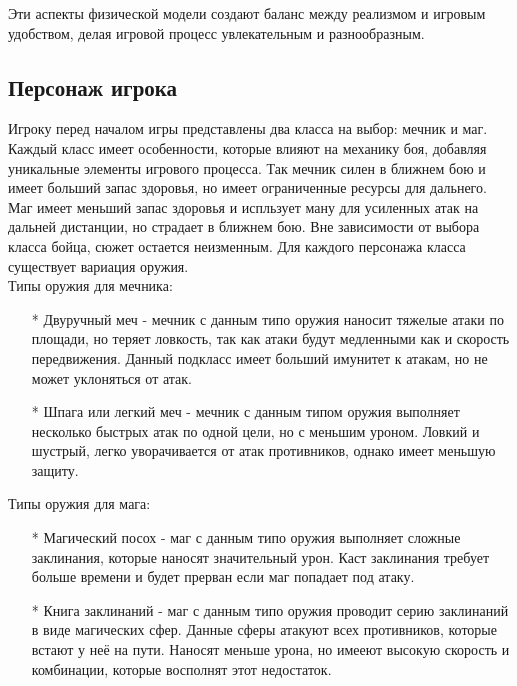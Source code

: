 \documentclass{article}
\begin{document}
Эти аспекты физической модели создают баланс между реализмом и игровым удобством, делая игровой процесс увлекательным и разнообразным.

\subsection{Персонаж игрока}
\par Игроку перед началом игры представлены два класса на выбор: мечник и маг. Каждый класс имеет особенности, которые влияют на механику боя, добавляя уникальные элементы игрового процесса. Так мечник силен в ближнем бою и имеет больший запас здоровья, но имеет ограниченные ресурсы для дальнего. Маг имеет меньший запас здоровья и испльзует ману для усиленных атак на дальней дистанции, но страдает в ближнем бою. Вне зависимости от выбора класса бойца, сюжет остается неизменным. Для каждого персонажа класса существует вариация оружия. \\
Типы оружия для мечника: 
\begin{itemize}
\item[*] Двуручный меч - мечник с данным типо оружия наносит тяжелые атаки по площади, но теряет ловкость, так как атаки будут медленными как и скорость передвижения. Данный подкласс имеет больший имунитет к атакам, но не может уклоняться от атак.
\item[*] Шпага или легкий меч - мечник с данным типом оружия выполняет несколько быстрых атак по одной цели, но с меньшим уроном. Ловкий и шустрый, легко уворачивается от атак противников, однако имеет меньшую защиту.
\end{itemize}
Типы оружия для мага: \\
\begin{itemize}
\item[*] Магический посох - маг с данным типо оружия выполняет сложные заклинания, которые наносят значительный урон. Каст заклинания требует больше времени и будет прерван если маг попадает под атаку.
\item[*] Книга заклинаний - маг с данным типо оружия проводит серию заклинаний в виде магических сфер. Данные сферы атакуют всех противников, которые встают у неё на пути. Наносят меньше урона, но имееют высокую скорость и комбинации, которые восполнят этот недостаток.
\end{itemize}
\end{document}
